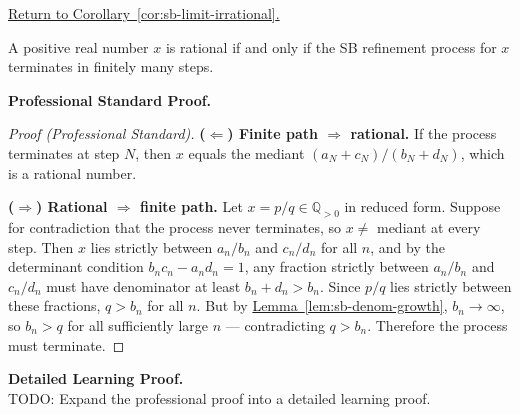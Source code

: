 
\newpage
{}
\label{prf:sb-limit-irrational}

\begin{remark*}[Return]
\hyperref[cor:sb-limit-irrational]{Return to Corollary~\ref*{cor:sb-limit-irrational}.}
\end{remark*}

\begin{theorem*}
A positive real number $x$ is rational if and only if the SB refinement
process for $x$ terminates in finitely many steps.
\end{theorem*}

\textbf{Professional Standard Proof.}~\\
\begin{proof}
[Proof (Professional Standard)]
\textbf{($\Leftarrow$) Finite path $\Rightarrow$ rational.}
If the process terminates at step $N$, then $x$ equals the mediant
$(a_N + c_N)/(b_N + d_N)$, which is a rational number.

\textbf{($\Rightarrow$) Rational $\Rightarrow$ finite path.}
Let $x = p/q \in \mathbb{Q}_{>0}$ in reduced form.  Suppose for
contradiction that the process never terminates, so $x \neq$ mediant at
every step.  Then $x$ lies strictly between $a_n/b_n$ and $c_n/d_n$ for
all $n$, and by the determinant condition $b_n c_n - a_n d_n = 1$, any
fraction strictly between $a_n/b_n$ and $c_n/d_n$ must have denominator
at least $b_n + d_n > b_n$.  Since $p/q$ lies strictly between these
fractions, $q > b_n$ for all $n$.  But by
\hyperref[lem:sb-denom-growth]{Lemma~\ref*{lem:sb-denom-growth}},
$b_n \to \infty$, so $b_n > q$ for all sufficiently large $n$ —
contradicting $q > b_n$.  Therefore the process must terminate.
\end{proof}

\textbf{Detailed Learning Proof.}~\\
TODO: Expand the professional proof into a detailed learning proof.


